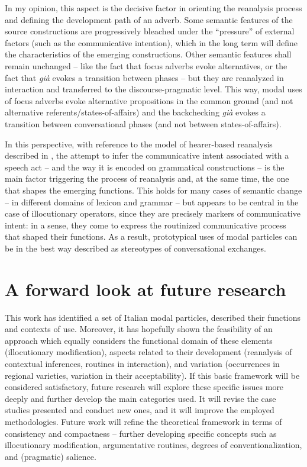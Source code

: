 In my opinion, this aspect is the decisive factor in orienting the reanalysis process and defining the development path of an adverb. Some semantic features of the source constructions are progressively bleached under the “pressure” of external factors (such as the communicative intention), which in the long term will define the characteristics of the emerging constructions. Other semantic features shall remain unchanged – like the fact that focus adverbs evoke alternatives, or the fact that \textit{già} evokes a transition between phases – but they are reanalyzed in interaction and transferred to the discourse-pragmatic level. This way, modal uses of focus adverbs evoke alternative propositions in the common ground (and not alternative referents/states-of-affairs) and the backchecking \textit{già} evokes a transition between conversational phases (and not between states-of-affairs).

In this perspective, with reference to the model of hearer-based reanalysis described in , the attempt to infer the communicative intent associated with a speech act – and the way it is encoded on grammatical constructions – is the main factor triggering the process of reanalysis and, at the same time, the one that shapes the emerging functions. This holds for many cases of semantic change – in different domains of lexicon and grammar – but appears to be central in the case of illocutionary operators, since they are precisely markers of communicative intent: in a sense, they come to express the routinized communicative process that shaped their functions. As a result, prototypical uses of modal particles can be in the best way described as stereotypes of conversational exchanges.

\section{A forward look at future research}
\hypertarget{Toc124860699}{}
This work has identified a set of Italian modal particles, described their functions and contexts of use. Moreover, it has hopefully shown the feasibility of an approach which equally considers the functional domain of these elements (illocutionary modification), aspects related to their development (reanalysis of contextual inferences, routines in interaction), and variation (occurrences in regional varieties, variation in their acceptability). If this basic framework will be considered satisfactory, future research will explore these specific issues more deeply and further develop the main categories used. It will revise the case studies presented and conduct new ones, and it will improve the employed methodologies. Future work will refine the theoretical framework in terms of consistency and compactness – further developing specific concepts such as illocutionary modification, argumentative routines, degrees of conventionalization, and (pragmatic) salience.

